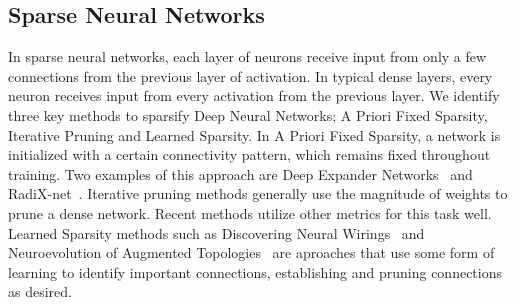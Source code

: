\subsection{Sparse Neural Networks}
In sparse neural networks, each layer of neurons receive input from only a few connections from the previous layer of activation. In typical dense layers, every neuron receives input from every activation from the previous layer. We identify three key methods to sparsify Deep Neural Networks; A Priori Fixed Sparsity, Iterative Pruning and Learned Sparsity. In A Priori Fixed Sparsity, a network is initialized with a certain connectivity pattern, which remains fixed throughout training. Two examples of this approach are Deep Expander Networks~\cite{prabhu2018deep} and RadiX-net~\cite{DBLP:journals/corr/abs-1905-00416}. Iterative pruning methods generally use the magnitude of weights to prune a dense network. Recent methods utilize other metrics for this task well. Learned Sparsity methods such as Discovering Neural Wirings~\cite{DBLP:journals/corr/abs-1906-00586} and Neuroevolution of Augmented Topologies~\cite{stanley2002evolving} are aproaches that use some form of learning to identify important connections, establishing and pruning connections as desired. 



